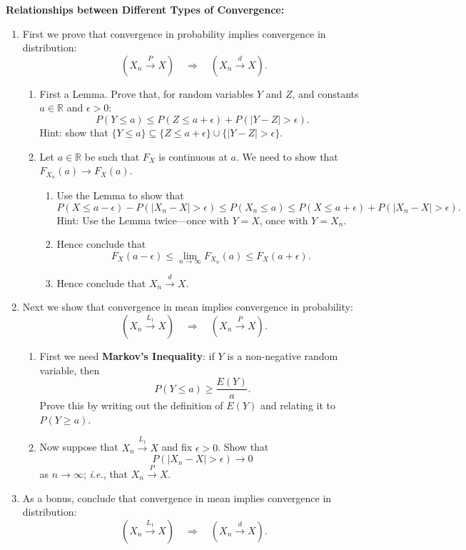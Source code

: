 \documentclass{article}
\begin{document}
\textbf{Relationships between Different Types of Convergence:}\bigskip

\begin{enumerate}
	\item First we prove that convergence in probability implies convergence in distribution:
		\[\left(X_n\xrightarrow{P}X\right)\quad\Rightarrow\quad \left(X_n\xrightarrow{d} X\right).\]
		\begin{enumerate}
			\item First a Lemma. Prove that, for random variables $Y$ and $Z$, and constants $a\in\mathbb{R}$ and $\epsilon>0$:
				\[P(Y\leq a)\leq P(Z\leq a+\epsilon)+P(|Y-Z|>\epsilon).\]
				Hint: show that $\{Y\leq a\}\subseteq \{Z\leq a+\epsilon\}\cup\{|Y-Z|>\epsilon\}$.
			\item Let $a\in\mathbb{R}$ be such that $F_X$ is continuous at $a$. We need to show that $F_{X_n}(a)\to F_X(a)$.
				\begin{enumerate}
					\item Use the Lemma to show that
						\[P(X\leq a-\epsilon)-P(|X_n-X|>\epsilon)\leq P(X_n\leq a)\leq P(X\leq a+\epsilon)+P(|X_n-X|>\epsilon).\]
						Hint: Use the Lemma twice---once with $Y=X$, once with $Y=X_n$.
					\item Hence conclude that
						\[F_X(a-\epsilon)\leq \lim_{n\to \infty} F_{X_n}(a)\leq F_X(a+\epsilon).\]
					\item Hence conclude that $X_n\xrightarrow{d}X$.
				\end{enumerate}
		\end{enumerate}
	\item Next we show that convergence in mean implies convergence in probability:
		\[\left(X_n\xrightarrow{L_1}X\right)\quad\Rightarrow\quad\left(X_n\xrightarrow{P}X\right).\]
		\begin{enumerate}
			\item First we need \textbf{Markov's Inequality}: if $Y$ is a non-negative random variable, then
				\[P(Y\leq a)\geq \frac{E(Y)}{a}.\]
				Prove this by writing out the definition of $E(Y)$ and relating it to $P(Y\geq a)$.
			\item Now suppose that $X_n\xrightarrow{L_1}X$ and fix $\epsilon>0$. Show that
				\[P(|X_n-X|>\epsilon)\to 0\]
				as $n\to \infty$; \textit{i.e.}, that $X_n\xrightarrow{P}X$.
		\end{enumerate}
	\item As a bonus, conclude that convergence in mean implies convergence in distribution:
		\[\left(X_n\xrightarrow{L_1}X\right)\quad\Rightarrow\quad \left(X_n\xrightarrow{d} X\right).\]
\end{enumerate}
\end{document}

